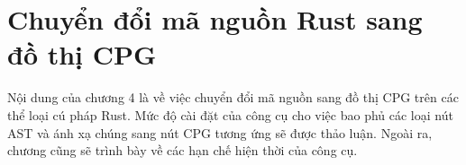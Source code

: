 \chapter{Chuyển đổi mã nguồn Rust sang đồ thị CPG}
\label{chap:mapping}


Nội dung của chương 4 là về việc chuyển đổi mã nguồn sang đồ thị CPG trên các thể loại cú pháp Rust.
Mức độ cài đặt của công cụ cho việc bao phủ các loại nút AST và ánh xạ chúng sang nút CPG tương ứng sẽ được thảo luận.
Ngoài ra, chương cũng sẽ trình bày về các hạn chế hiện thời của công cụ.





% 
% 
